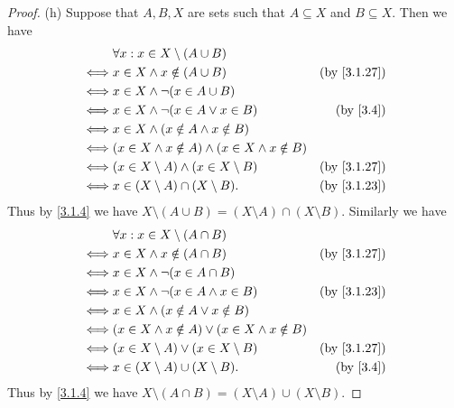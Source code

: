\begin{proof}{(h)}
  Suppose that \(A, B, X\) are sets such that \(A \subseteq X\) and \(B \subseteq X\).
  Then we have
  \begin{align*}
         & \forall x : x \in X \setminus (A \cup B)                                                \\
    \iff & x \in X \land x \notin (A \cup B)                           & \text{(by \cref{3.1.27})} \\
    \iff & x \in X \land \lnot (x \in A \cup B)                                                    \\
    \iff & x \in X \land \lnot (x \in A \lor x \in B)                  & \text{(by \cref{3.4})}    \\
    \iff & x \in X \land (x \notin A \land x \notin B)                                             \\
    \iff & (x \in X \land x \notin A) \land (x \in X \land x \notin B)                             \\
    \iff & (x \in X \setminus A) \land (x \in X \setminus B)           & \text{(by \cref{3.1.27})} \\
    \iff & x \in (X \setminus A) \cap (X \setminus B).                 & \text{(by \cref{3.1.23})}
  \end{align*}
  Thus by \cref{3.1.4} we have \(X \setminus (A \cup B) = (X \setminus A) \cap (X \setminus B)\).
  Similarly we have
  \begin{align*}
         & \forall x : x \in X \setminus (A \cap B)                                               \\
    \iff & x \in X \land x \notin (A \cap B)                          & \text{(by \cref{3.1.27})} \\
    \iff & x \in X \land \lnot (x \in A \cap B)                                                   \\
    \iff & x \in X \land \lnot (x \in A \land x \in B)                & \text{(by \cref{3.1.23})} \\
    \iff & x \in X \land (x \notin A \lor x \notin B)                                             \\
    \iff & (x \in X \land x \notin A) \lor (x \in X \land x \notin B)                             \\
    \iff & (x \in X \setminus A) \lor (x \in X \setminus B)           & \text{(by \cref{3.1.27})} \\
    \iff & x \in (X \setminus A) \cup (X \setminus B).                & \text{(by \cref{3.4})}
  \end{align*}
  Thus by \cref{3.1.4} we have \(X \setminus (A \cap B) = (X \setminus A) \cup (X \setminus B)\).
\end{proof}

